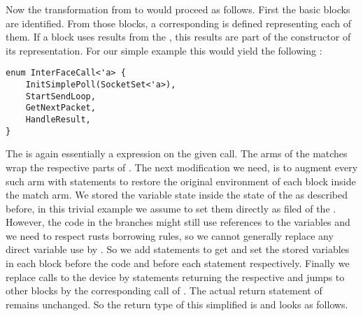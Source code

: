 Now the transformation from  to  would proceed as follows. First the basic blocks are identified. From those blocks, a corresponding  is defined representing each of them. If a block uses results from the \dev{}, this results are part of the constructor of its  representation. For our simple example this would yield the following :

\begin{verbatim}
enum InterFaceCall<'a> {
    InitSimplePoll(SocketSet<'a>),
    StartSendLoop,
    GetNextPacket,
    HandleResult,
}
\end{verbatim}

The  is again essentially a  expression on the given call. The arms of the matches wrap the respective parts of . The next modification we need, is to augment every such arm with statements to restore the original environment of each block inside the match arm. We stored the variable state inside the state of the \stack{} as described before, in this trivial example we assume to set them directly as filed of the \stack{}. However, the code in the branches might still use references to the variables and we need to respect rusts borrowing rules, so we cannot generally replace any direct variable use  by . So we add statements to get and set the stored variables in each block before the code and before each  statement respectively. Finally we replace calls to the device by statements returning the respective  and jumps to other blocks by the corresponding call of . The actual return statement of  remains unchanged. So the return type of this simplified  is  and looks as follows. 

